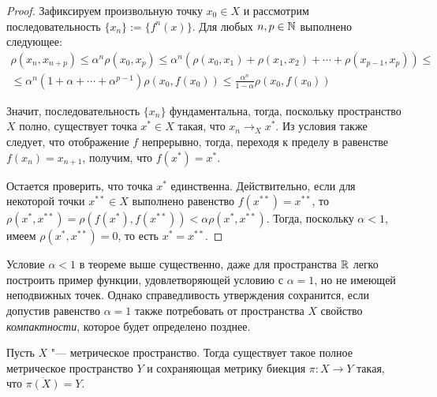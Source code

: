 \begin{proof}
    Зафиксируем произвольную точку $x_0 \in X$ и рассмотрим последовательность $\{x_n\} := \{f^n(x)\}$. Для любых $n, p \in \mathbb{N}$ выполнено следующее:
    \begin{multline*}
        \rho(x_n, x_{n + p}) \le
        \alpha^n \rho(x_0, x_p) \le
        \alpha^n \left(\rho(x_0, x_1) + \rho(x_1, x_2) + \dotsb + \rho(x_{p - 1}, x_p)\right) \le
        \\
        \le \alpha^n \left(1 + \alpha + \dotsb + \alpha^{p-1}\right)\rho(x_0, f(x_0)) \le \frac{\alpha^n}{1 - \alpha} \rho(x_0, f(x_0))
    \end{multline*}

    Значит, последовательность $\{x_n\}$ фундаментальна, тогда, поскольку пространство $X$ полно, существует точка $x^* \in X$ такая, что $x_n \to_X x^*$. Из условия также следует, что отображение $f$ непрерывно, тогда, переходя к пределу в равенстве $f(x_n) = x_{n + 1}$, получим, что $f(x^*) = x^*$.
    
    Остается проверить, что точка $x^*$ единственна. Действительно, если для некоторой точки $x^{**} \in X$ выполнено равенство $f(x^{**}) = x^{**}$, то $\rho(x^{*}, x^{**}) = \rho(f(x^{*}), f(x^{**})) < \alpha\rho(x^{*}, x^{**})$. Тогда, поскольку $\alpha < 1$, имеем $\rho(x^{*}, x^{**}) = 0$, то есть $x^{*} = x^{**}$.
\end{proof}

\begin{note}
    Условие $\alpha < 1$ в теореме выше существенно, даже для пространства $\mathbb{R}$ легко построить пример функции, удовлетворяющей условию с $\alpha = 1$, но не имеющей неподвижных точек. Однако справедливость утверждения сохранится, если допустив равенство $\alpha = 1$ также потребовать от пространства $X$ свойство \textit{компактности}, которое будет определено позднее.
\end{note}

\begin{theorem}
    Пусть $X$ "--- метрическое пространство. Тогда существует такое полное метрическое пространство $Y$ и сохраняющая метрику биекция $\pi : X \to Y$ такая, что $\overline{\pi(X)} = Y$.
\end{theorem}